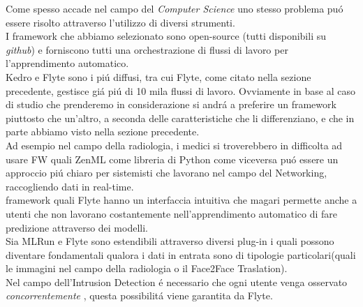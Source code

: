 \documentclass[../tesi.tex]{subfiles}
\begin{document}
Come spesso accade nel campo del \textit{Computer Science} uno stesso problema puó essere risolto attraverso l'utilizzo di diversi strumenti.\\
I framework che abbiamo selezionato sono open-source (tutti disponibili su \textit{github}) e forniscono tutti una  orchestrazione di flussi di lavoro per l'apprendimento automatico.\\
Kedro e Flyte sono i piú diffusi, tra cui Flyte, come citato nella sezione precedente, gestisce giá piú di 10 mila flussi di lavoro.
Ovviamente in base al caso di studio che prenderemo in considerazione si andrá a preferire un \Gls{framework} piuttosto che un'altro, a seconda delle caratteristiche che li differenziano, e che in parte abbiamo visto nella sezione precedente.\\
Ad esempio nel campo della radiologia, i medici si troverebbero in difficolta ad usare FW quali ZenML come libreria di Python come viceversa puó essere un approccio piú chiaro per sistemisti che lavorano nel campo del Networking, raccogliendo dati in real-time.\\
\Gls{framework} quali Flyte hanno un interfaccia intuitiva che magari permette anche a utenti che non lavorano costantemente nell'apprendimento automatico di fare predizione attraverso dei modelli.\\
Sia MLRun e Flyte sono estendibili attraverso diversi plug-in i quali possono diventare fondamentali qualora i dati in entrata sono di tipologie particolari(quali le immagini nel campo della radiologia o il Face2Face Traslation).\\
Nel campo dell'Intrusion Detection é necessario che ogni utente venga osservato \textit{concorrentemente} , questa possibilitá viene garantita da Flyte.
\end{document}
